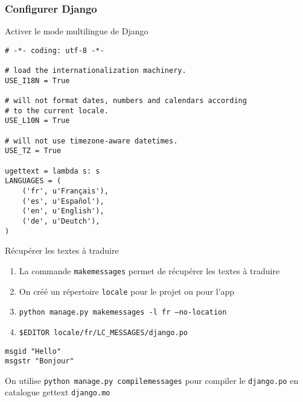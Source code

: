 \documentclass{beamer}
\begin{document}
\begin{frame}[fragile]
  \frametitle{Configurer Django}
  \begin{block}{Activer le mode multilingue de Django}
    \pause
  \begin{lstlisting}
# -*- coding: utf-8 -*-

# load the internationalization machinery.
USE_I18N = True

# will not format dates, numbers and calendars according
# to the current locale.
USE_L10N = True

# will not use timezone-aware datetimes.
USE_TZ = True

ugettext = lambda s: s
LANGUAGES = (
    ('fr', u'Français'),
    ('es', u'Español'),
    ('en', u'English'),
    ('de', u'Deutch'),
)
  \end{lstlisting}


  \end{block}

\end{frame}

\begin{frame}[fragile]
  \begin{exampleblock}{Récupérer les textes à traduire}
    \begin{enumerate}
      \pause \item La commande \texttt{makemessages} permet de récupérer les textes à traduire
      \pause \item On créé un répertoire \texttt{locale} pour le projet ou pour l'app
      \pause \item \texttt{python manage.py makemessages -l fr --no-location}
      \pause \item \texttt{\$EDITOR locale/fr/LC\_MESSAGES/django.po}
    \end{enumerate}
  \end{exampleblock}
  \pause

  \begin{lstlisting}
msgid "Hello"
msgstr "Bonjour"
  \end{lstlisting}

\pause
On utilise \texttt{python manage.py compilemessages} pour compiler le \texttt{django.po} en catalogue gettext \texttt{django.mo}

\end{frame}
\end{document}
